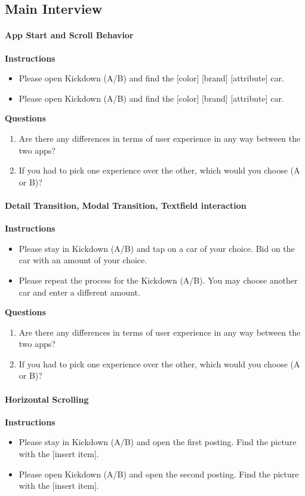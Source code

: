 \subsection{Main Interview}
\paragraph*{App Start and Scroll Behavior}\hfill \break
\textbf{Instructions}
\begin{itemize}
    \item Please open Kickdown (A/B) and find the [color] [brand] [attribute] car.
    \item Please open Kickdown (A/B) and find the [color] [brand] [attribute] car.
\end{itemize}

\textbf{Questions}
\begin{enumerate}
    \item Are there any differences in terms of user experience in any way between the two apps?
    \item If you had to pick one experience over the other, which would you choose (A or B)?
\end{enumerate}

\paragraph*{Detail Transition, Modal Transition, Textfield interaction}\hfill \break
\textbf{Instructions}
\begin{itemize}
    \item Please stay in Kickdown (A/B) and tap on a car of your choice. Bid on the car with an amount of your choice.
    \item Please repeat the process for the Kickdown (A/B). You may choose another car and enter a different amount.
\end{itemize}

\textbf{Questions}
\begin{enumerate}
    \item Are there any differences in terms of user experience in any way between the two apps?
    \item If you had to pick one experience over the other, which would you choose (A or B)?
\end{enumerate}


\paragraph*{Horizontal Scrolling}\hfill \break
\textbf{Instructions}
\begin{itemize}
    \item Please stay in Kickdown (A/B) and open the first posting. Find the picture with the [insert item].
    \item Please open Kickdown (A/B) and open the second posting. Find the picture with the [insert item].
\end{itemize}

